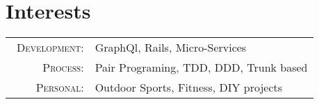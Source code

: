 %
%
%

    {\section{\texorpdfstring{\color{Blue}Interests}{Interests}}
    \begin{tabular}{rl}
    \   \textsc{Development:} & GraphQl, Rails, Micro-Services \\ 
        \textsc{Process:} & Pair Programing, TDD, DDD, Trunk based\\ 
        \textsc{Personal:} & Outdoor Sports, Fitness, DIY projects \\ 
    \end{tabular}
}
